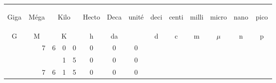 \begin{center}
    \begin{tabular}{|c|c|c|c|c|c|c|c|c|c|c|c|c|c|c|c|c|c|c|c|c|c|c|c|}
        \hline
              \multicolumn{3}{|c|}{\begin{sideways}Giga\end{sideways}} & \multicolumn{3}{c|}{\begin{sideways}Méga\end{sideways}} & \multicolumn{3}{c|}{\begin{sideways}Kilo\end{sideways}} & \begin{sideways}Hecto\end{sideways} & \begin{sideways}Deca\end{sideways} & \begin{sideways}unité\end{sideways} & \begin{sideways}deci\end{sideways} & \begin{sideways}centi\end{sideways} & \begin{sideways}milli\end{sideways} & \multicolumn{3}{c|}{\begin{sideways}micro\end{sideways}} & \multicolumn{3}{c|}{\begin{sideways}nano\end{sideways}} & \multicolumn{3}{c|}{\begin{sideways}pico\end{sideways}} \\
           \multicolumn{3}{|c|}{G} & \multicolumn{3}{c|}{M} & \multicolumn{3}{c|}{K} & h & da & & d & c & m & \multicolumn{3}{c|}{$\mu$} & \multicolumn{3}{c|}{n} & \multicolumn{3}{c|}{p}  \\
    	\hline
    		&&&&&7& 6  &0&0&0&0&0&&&&&&&&&&&& \\
			&&&&&&&1&5&0&0&0&&&&&&&&&&&& \\
		\hline
			&&&&&7&6&1&5&0&0&0&&&&&&&&&&&& \\
		\hline
    \end{tabular}
\end{center}
